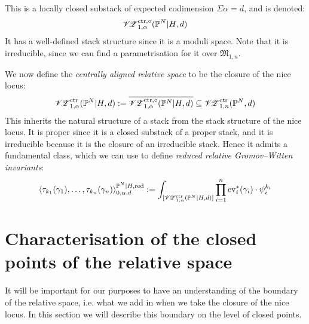\documentclass[11pt]{amsart}
\newcommand{\PP}{\mathbb P}
\newcommand{\VZc}[4]{\mathcal{V\!Z}^{\rm{ctr}}_{#1,#2}(#3,#4)}
\newcommand{\VZco}[4]{\mathcal{V\!Z}^{\rm{ctr},\circ}_{#1,#2}(#3,#4)}
\newcommand{\ev}{\operatorname{ev}}
\newcommand{\Mfrak}{\mathfrak{M}}
\theoremstyle{definition}
\theoremstyle{definition}
\begin{document}
This is a locally closed substack of expected codimension $\Sigma \alpha=d$, and is denoted:
\begin{equation*} \VZco{1}{\alpha}{\PP^N|H}{d} \end{equation*}
It has a well-defined stack structure since it is a moduli space. Note that it is irreducible, since we can find a parametrisation for it over $\Mfrak_{1,n}$.

We now define the \emph{centrally aligned relative space} to be the closure of the nice locus:
\begin{equation*} \VZc{1}{\alpha}{\PP^N|H}{d} := \overline{\VZco{1}{\alpha}{\PP^N|H}{d}} \subseteq \VZc{1}{n}{\PP^N}{d} \end{equation*}
This inherits the natural structure of a stack from the stack structure of the nice locus. It is proper since it is a closed substack of a proper stack, and it is irreducible because it is the closure of an irreducible stack. Hence it admits a fundamental class, which we can use to define \emph{reduced relative Gromov--Witten invariants}:
\begin{equation*} \langle \tau_{k_1}(\gamma_1), \ldots, \tau_{k_n}(\gamma_n) \rangle^{\PP^N|H, \operatorname{red}}_{0,\alpha,d} := \int_{[\VZc{1}{\alpha}{\PP^N|H}{d}]} \prod_{i=1}^n \ev_i^*(\gamma_i) \cdot \psi_i^{k_i} \end{equation*}

\section{Characterisation of the closed points of the relative space}
It will be important for our purposes to have an understanding of the boundary of the relative space, i.e. what we add in when we take the closure of the nice locus. In this section we will describe this boundary on the level of closed points.
\end{document}
